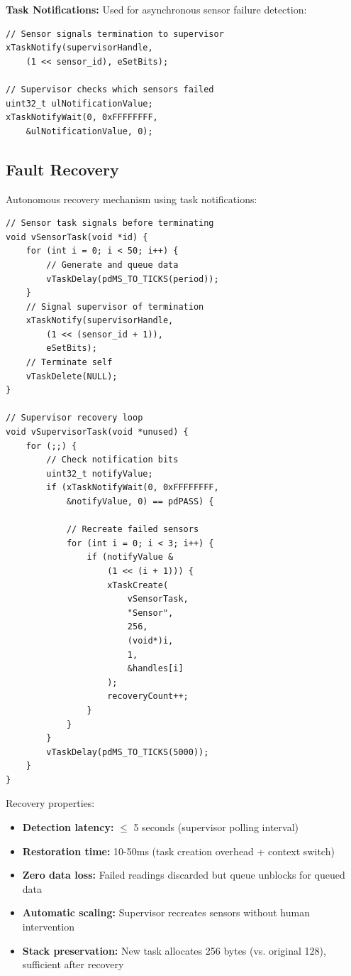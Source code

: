 \documentclass[conference]{IEEEtran}
\begin{document}
\textbf{Task Notifications:} Used for asynchronous sensor failure detection:

\begin{lstlisting}
// Sensor signals termination to supervisor
xTaskNotify(supervisorHandle, 
    (1 << sensor_id), eSetBits);

// Supervisor checks which sensors failed
uint32_t ulNotificationValue;
xTaskNotifyWait(0, 0xFFFFFFFF, 
    &ulNotificationValue, 0);
\end{lstlisting}

\subsection{Fault Recovery}
Autonomous recovery mechanism using task notifications:

\begin{lstlisting}
// Sensor task signals before terminating
void vSensorTask(void *id) {
    for (int i = 0; i < 50; i++) {
        // Generate and queue data
        vTaskDelay(pdMS_TO_TICKS(period));
    }
    // Signal supervisor of termination
    xTaskNotify(supervisorHandle, 
        (1 << (sensor_id + 1)), 
        eSetBits);
    // Terminate self
    vTaskDelete(NULL);
}

// Supervisor recovery loop
void vSupervisorTask(void *unused) {
    for (;;) {
        // Check notification bits
        uint32_t notifyValue;
        if (xTaskNotifyWait(0, 0xFFFFFFFF, 
            &notifyValue, 0) == pdPASS) {
            
            // Recreate failed sensors
            for (int i = 0; i < 3; i++) {
                if (notifyValue & 
                    (1 << (i + 1))) {
                    xTaskCreate(
                        vSensorTask, 
                        "Sensor", 
                        256, 
                        (void*)i, 
                        1, 
                        &handles[i]
                    );
                    recoveryCount++;
                }
            }
        }
        vTaskDelay(pdMS_TO_TICKS(5000));
    }
}
\end{lstlisting}

Recovery properties:
\begin{itemize}
    \item \textbf{Detection latency:} \(\leq\) 5 seconds (supervisor polling interval)
    \item \textbf{Restoration time:} 10-50ms (task creation overhead + context switch)
    \item \textbf{Zero data loss:} Failed readings discarded but queue unblocks for queued data
    \item \textbf{Automatic scaling:} Supervisor recreates sensors without human intervention
    \item \textbf{Stack preservation:} New task allocates 256 bytes (vs. original 128), sufficient after recovery
\end{itemize}
\end{document}
